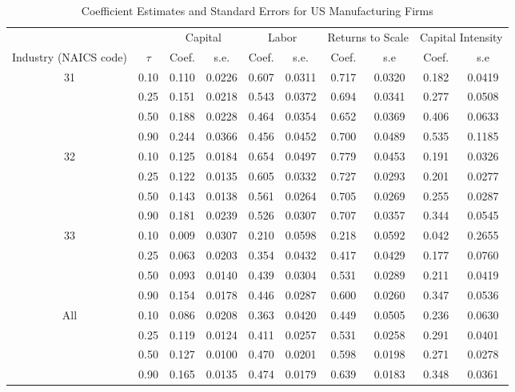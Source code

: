\begin{table}[ht]
\centering
\caption{Coefficient Estimates and Standard Errors for US Manufacturing Firms} 
\begin{tabular}{cccccccccc}
  \hline\hline & & \multicolumn{2}{c}{Capital}  & \multicolumn{2}{c}{Labor} & \multicolumn{2}{c}{Returns to Scale} & \multicolumn{2}{c}{Capital Intensity}\\ \cmidrule(lr){3-4} \cmidrule(lr){5-6} \cmidrule(lr){7-8} \cmidrule(lr){9-10}Industry (NAICS code) & $\tau$ & Coef. & s.e. & Coef. & s.e. & Coef. & s.e & Coef. & s.e \\ 
  \hline
31 & 0.10 & 0.110 & 0.0226 & 0.607 & 0.0311 & 0.717 & 0.0320 & 0.182 & 0.0419 \\ 
   & 0.25 & 0.151 & 0.0218 & 0.543 & 0.0372 & 0.694 & 0.0341 & 0.277 & 0.0508 \\ 
   & 0.50 & 0.188 & 0.0228 & 0.464 & 0.0354 & 0.652 & 0.0369 & 0.406 & 0.0633 \\ 
   & 0.90 & 0.244 & 0.0366 & 0.456 & 0.0452 & 0.700 & 0.0489 & 0.535 & 0.1185 \\ 
  32 & 0.10 & 0.125 & 0.0184 & 0.654 & 0.0497 & 0.779 & 0.0453 & 0.191 & 0.0326 \\ 
   & 0.25 & 0.122 & 0.0135 & 0.605 & 0.0332 & 0.727 & 0.0293 & 0.201 & 0.0277 \\ 
   & 0.50 & 0.143 & 0.0138 & 0.561 & 0.0264 & 0.705 & 0.0269 & 0.255 & 0.0287 \\ 
   & 0.90 & 0.181 & 0.0239 & 0.526 & 0.0307 & 0.707 & 0.0357 & 0.344 & 0.0545 \\ 
  33 & 0.10 & 0.009 & 0.0307 & 0.210 & 0.0598 & 0.218 & 0.0592 & 0.042 & 0.2655 \\ 
   & 0.25 & 0.063 & 0.0203 & 0.354 & 0.0432 & 0.417 & 0.0429 & 0.177 & 0.0760 \\ 
   & 0.50 & 0.093 & 0.0140 & 0.439 & 0.0304 & 0.531 & 0.0289 & 0.211 & 0.0419 \\ 
   & 0.90 & 0.154 & 0.0178 & 0.446 & 0.0287 & 0.600 & 0.0260 & 0.347 & 0.0536 \\ 
  All & 0.10 & 0.086 & 0.0208 & 0.363 & 0.0420 & 0.449 & 0.0505 & 0.236 & 0.0630 \\ 
   & 0.25 & 0.119 & 0.0124 & 0.411 & 0.0257 & 0.531 & 0.0258 & 0.291 & 0.0401 \\ 
   & 0.50 & 0.127 & 0.0100 & 0.470 & 0.0201 & 0.598 & 0.0198 & 0.271 & 0.0278 \\ 
   & 0.90 & 0.165 & 0.0135 & 0.474 & 0.0179 & 0.639 & 0.0183 & 0.348 & 0.0361 \\ 
   \hline
\end{tabular}
\end{table}
